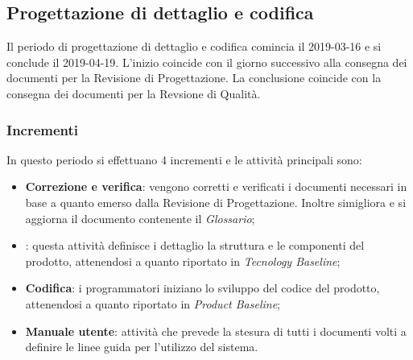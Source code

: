 \subsection{Progettazione di dettaglio e codifica}
Il periodo di progettazione di dettaglio e codifica comincia il 2019-03-16 e si conclude il 2019-04-19. L'inizio coincide con il giorno successivo alla consegna dei documenti per la Revisione di Progettazione. La conclusione coincide con la consegna dei documenti per la Revsione di Qualità. 
\subsubsection{Incrementi}
In questo periodo si effettuano 4 incrementi e le attività principali sono:
\begin{itemize}
\item{\textbf{Correzione e verifica}: vengono corretti e verificati i documenti necessari in base a quanto emerso dalla Revisione di Progettazione. Inoltre simigliora e si aggiorna il documento contenente il \emph{Glossario};} 
\item{\textbf{}: questa attività definisce i dettaglio la struttura e le componenti del prodotto, attenendosi a quanto riportato in \emph{Tecnology Baseline};} 
\item{\textbf{Codifica}: i programmatori iniziano lo sviluppo del codice del prodotto, attenendosi a quanto riportato in \emph{Product Baseline};}	
\item{\textbf{Manuale utente}: attività che prevede la stesura di tutti i documenti volti a definire le linee guida per l'utilizzo del sistema.}
\end{itemize}
\pagebreak